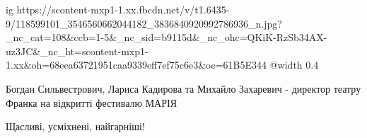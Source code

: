  
 
 
 
 
\ifcmt
  ig https://scontent-mxp1-1.xx.fbcdn.net/v/t1.6435-9/118599101_3546560662044182_3836840920992786936_n.jpg?_nc_cat=108&ccb=1-5&_nc_sid=b9115d&_nc_ohc=QKiK-RzSb34AX-uz3JC&_nc_ht=scontent-mxp1-1.xx&oh=68eea63721951caa9339eff7ef75c6e3&oe=61B5E344
  @width 0.4
\fi


Богдан Сильвестрович, Лариса Кадирова та Михайло Захаревич - директор театру
Франка на відкритті фестивалю МАРІЯ


Щасливі, усміхнені, найгарніші!
